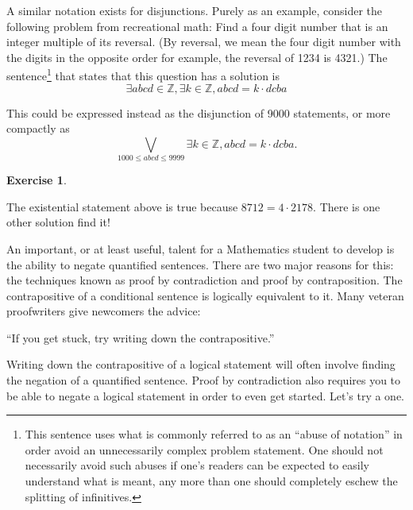 \documentclass[10pt,]{book}
\theoremstyle{plain}
\theoremstyle{definition}
\theoremstyle{definition}
\newtheorem{exercise}[theorem]{Exercise}
\numberwithin{equation}{section}
\begin{document}
    A similar notation exists for disjunctions. Purely as an example, consider
    the following problem from recreational math: Find a four digit number that
    is an integer multiple of its reversal. (By reversal, we mean the four
    digit number with the digits in the opposite order \textemdash{} for example, the
    reversal of 1234 is 4321.) The sentence\footnote{This sentence uses what 
    is commonly referred to as an ``abuse of notation'' in order avoid an 
    unnecessarily complex problem statement.  One should not necessarily 
    avoid such abuses if one's readers can be expected to easily understand 
    what is meant, any more than one should completely eschew the splitting 
    of infinitives.\label{fn-16}}
    that states that this question has a solution is
    \begin{equation*}
      \exists abcd \in {\mathbb Z},  \exists k \in {\mathbb Z}, abcd = k\cdot dcba
    \end{equation*}
\par

    This could be expressed instead as the disjunction of 9000 statements, or more
    compactly as
    \begin{equation*}
      \bigvee_{1000\leq abcd \leq 9999}  \exists k \in {\mathbb Z}, abcd = k\cdot dcba.
    \end{equation*}
\begin{exercise}\label{exercise-14}

        The existential statement above is true because \(8712 = 4\cdot 2178\).
        There is one other solution \textemdash{} find it!
\end{exercise}
\par

    An important, or at least useful, talent for a Mathematics student to develop
    is the ability to negate quantified sentences. There are two major reasons for this:
    the techniques known as proof by contradiction and proof by contraposition.
    The contrapositive of a conditional sentence is logically
    equivalent to it. Many veteran proofwriters give newcomers the advice:
\par

    ``If you get stuck, try writing down the contrapositive.''
\par

    Writing down the contrapositive of a logical statement will often involve finding the
    negation of a quantified sentence. Proof by contradiction also requires you to be able to
    negate a logical statement in order to even get started. Let's try a one.
\par
\end{document}
